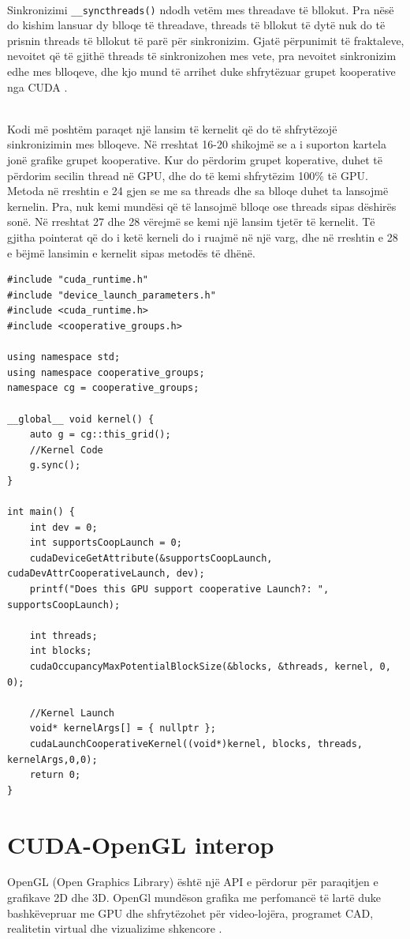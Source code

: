 \noindent \\Sinkronizimi \texttt{\_\_syncthreads()} ndodh vetëm mes threadave të bllokut. Pra nësë do kishim lansuar dy blloqe të threadave, threads të bllokut të dytë nuk do të prisnin threads të bllokut të parë për sinkronizim. Gjatë përpunimit të fraktaleve, nevoitet që të gjithë threads të sinkronizohen mes vete, pra nevoitet sinkronizim edhe mes blloqeve, dhe kjo mund të arrihet duke shfrytëzuar grupet kooperative nga CUDA \cite{cuda_guide}.

\noindent \\ Kodi më poshtëm paraqet një lansim të kernelit që do të shfrytëzojë sinkronizimin mes blloqeve. Në rreshtat 16-20 shikojmë se a i suporton kartela jonë grafike grupet kooperative. Kur do përdorim grupet koperative, duhet të përdorim secilin thread në GPU, dhe do të kemi shfrytëzim 100\% të GPU. Metoda në rreshtin e 24 gjen se me sa threads dhe sa blloqe duhet ta lansojmë kernelin. Pra, nuk kemi mundësi që të lansojmë blloqe ose threads sipas dëshirës sonë. Në rreshtat 27 dhe 28 vërejmë se kemi një lansim tjetër të kernelit. Të gjitha pointerat që do i ketë  kerneli do i ruajmë në një varg, dhe në rreshtin e 28 e bëjmë lansimin e kernelit sipas metodës të dhënë. \\

\begin{lstlisting}
#include "cuda_runtime.h"
#include "device_launch_parameters.h"
#include <cuda_runtime.h>
#include <cooperative_groups.h>

using namespace std;
using namespace cooperative_groups;
namespace cg = cooperative_groups;

__global__ void kernel() {
    auto g = cg::this_grid();
    //Kernel Code
    g.sync();
}

int main() {
    int dev = 0;
    int supportsCoopLaunch = 0;
    cudaDeviceGetAttribute(&supportsCoopLaunch, cudaDevAttrCooperativeLaunch, dev);
    printf("Does this GPU support cooperative Launch?: ", supportsCoopLaunch);

    int threads;
    int blocks;
    cudaOccupancyMaxPotentialBlockSize(&blocks, &threads, kernel, 0, 0);

    //Kernel Launch
    void* kernelArgs[] = { nullptr };
    cudaLaunchCooperativeKernel((void*)kernel, blocks, threads, kernelArgs,0,0);
    return 0;
}

\end{lstlisting}

\section{CUDA-OpenGL interop}
\noindent OpenGL (Open Graphics Library) është një API e përdorur për paraqitjen e grafikave 2D dhe 3D. OpenGl mundëson grafika me perfomancë të lartë duke bashkëvepruar me GPU dhe shfrytëzohet për video-lojëra, programet CAD, realitetin virtual dhe vizualizime shkencore \cite{opengl}.

